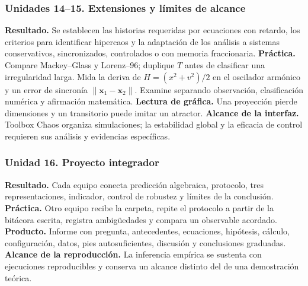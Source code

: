 \subsubsection*{Unidades 14--15. Extensiones y límites de alcance}
\textbf{Resultado.} Se establecen las historias requeridas por ecuaciones con retardo,
los criterios para identificar hipercaos y la adaptación de los análisis a sistemas
conservativos, sincronizados, controlados o con memoria fraccionaria.
\textbf{Práctica.} Compare Mackey--Glass y Lorenz--96; duplique \(T\) antes de
clasificar una irregularidad larga. Mida la deriva de
\(H=(x^2+v^2)/2\) en el oscilador armónico y un error de sincronía
\(\|\mathbf x_1-\mathbf x_2\|\). Examine  separando observación,
clasificación numérica y afirmación matemática.
\textbf{Lectura de gráfica.} Una proyección pierde dimensiones y un transitorio puede
imitar un atractor. \textbf{Alcance de la interfaz.} Toolbox Chaos organiza simulaciones;
la estabilidad global y la eficacia de control requieren sus análisis y evidencias específicas.

\subsubsection*{Unidad 16. Proyecto integrador}
\textbf{Resultado.} Cada equipo conecta predicción algebraica, protocolo, tres
representaciones, indicador, control de robustez y límites de la conclusión.
\textbf{Práctica.} Otro equipo recibe la carpeta, repite el protocolo a partir de la
bitácora escrita, registra ambigüedades y compara un observable acordado.
\textbf{Producto.} Informe con pregunta, antecedentes, ecuaciones, hipótesis, cálculo,
configuración, datos, pies autosuficientes, discusión y conclusiones graduadas.
\textbf{Alcance de la reproducción.} La inferencia empírica se sustenta con ejecuciones
reproducibles y conserva un alcance distinto del de una demostración teórica.

